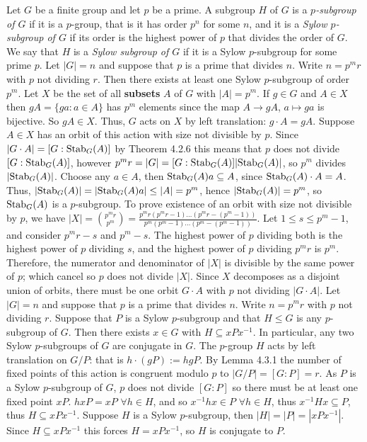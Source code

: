  Let $G$ be a finite group and let $p$ be a prime. A subgroup $H$ of $G$ is a \textit{$p$-subgroup of $G$} if it is a $p$-group, that is it has order $p^n$ for some $n$, and it is a \textit{Sylow $p$-subgroup of $G$} if its order is the highest power of $p$ that divides the order of $G$. We say that $H$ is a \textit{Sylow subgroup of $G$} if it is a Sylow $p$-subgroup for some prime $p$.
 Let $|G| = n$ and suppose that $p$ is a prime that divides $n$. Write $n = p^m r$ with $p$ not dividing $r$. Then there exists at least one Sylow $p$-subgroup of order $p^m$.
\wpf{} Let $X$ be the set of all \textbf{subsets} $A$ of $G$ with $|A| = p^m$. If $g \in G$ and $A \in X$ then $gA = \{ga : a \in A\}$ has $p^m$ elements since the map $A \to gA$, $a \mapsto ga$ is bijective. So $gA \in X.$ Thus, $G$ acts on $X$ by left translation: $g \cdot A = gA$. Suppose $A \in X$ has an orbit of this action with size not divisible by $p$. Since $|G \cdot A| = [G:\text{Stab}_G(A)]$ by Theorem 4.2.6 this means that $p$ does not divide $[G : \text{Stab}_G(A)]$, however $p^m r = |G| = [G:\text{Stab}_G(A)]|\text{Stab}_G(A)|$, so $p^m$ divides $|\text{Stab}_G(A)|$.
Choose any $a \in A$, then $\text{Stab}_G(A)a \subseteq A$, since $\text{Stab}_G(A) \cdot A = A$. Thus, $|\text{Stab}_G(A)| = |\text{Stab}_G(A)a| \le |A| = p^m$, hence $|\text{Stab}_G(A)| = p^m$, so $\text{Stab}_G(A)$ is a $p$-subgroup. To prove existence of an orbit with size not divisible by $p$, we have $|X| = \binom{p^mr}{p^m} = \frac{p^m r(p^m r -1)\ldots (p^mr -(p^m-1))}{p^m(p^m -1)\ldots (p^m -(p^m-1))}$. Let $1 \le s \le p^m -1$, and consider $p^m r - s$ and $p^m -s$. The highest power of $p$ dividing both is the highest power of $p$ dividing $s$, and the highest power of $p$ dividing $p^mr$ is $p^m$. Therefore, the numerator and denominator of $|X|$ is divisible by the same power of $p$; which cancel so $p$ does not divide $|X|$. Since $X$ decomposes as a disjoint union of orbits, there must be one orbit $G \cdot A$ with $p$ not dividing $|G \cdot A|$. 
%
 Let $|G| = n$ and suppose that $p$ is a prime that divides $n$. Write $n = p^m r$ with $p$ not dividing $r$. Suppose that $P$ is a Sylow $p$-subgroup and that $H \le G$ is any $p$-subgroup of $G$. Then there exists $x \in G$ with $H \subseteq xPx^{-1}$. In particular, any two Sylow $p$-subgroups of $G$ are conjugate in $G$.
\wpf{} The $p$-group $H$ acts by left translation on $G/P$: that is $h \cdot (gP) := hgP$. By Lemma 4.3.1 the number of fixed points of this action is congruent modulo $p$ to $|G/P| = [G : P] = r$. As $P$ is a Sylow $p$-subgroup of $G$, $p$ does not divide $[G:P]$ so there must be at least one fixed point $xP$. $hxP = xP$ $\forall h \in  H$, and so $x^{-1}hx \in P$ $\forall h \in H$, thus $x^{-1}Hx \subseteq P$, thus $H \subseteq xPx^{-1}$. Suppose $H$ is a Sylow $p$-subgroup, then $|H| = |P| = |xPx^{-1}|$. Since $H \subseteq xPx^{-1}$ this forces $H = xPx^{-1}$, so $H$ is conjugate to $P$.

